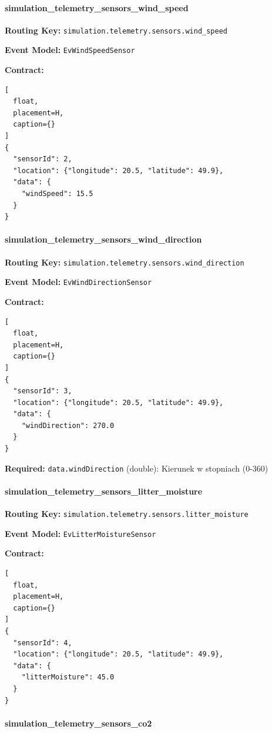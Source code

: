 \documentclass[11pt,a4paper] {article}
\begin{document}
\paragraph{simulation\_telemetry\_sensors\_wind\_speed}

\textbf{Routing Key:} \texttt{simulation.telemetry.sensors.wind\_speed}

\textbf{Event Model:} \texttt{EvWindSpeedSensor}

\textbf{Contract:}
\begin{lstlisting}[
  float,
  placement=H,
  caption={}
]
{
  "sensorId": 2,
  "location": {"longitude": 20.5, "latitude": 49.9},
  "data": {
    "windSpeed": 15.5
  }
}
\end{lstlisting}

\paragraph{simulation\_telemetry\_sensors\_wind\_direction}

\textbf{Routing Key:} \texttt{simulation.telemetry.sensors.wind\_direction}

\textbf{Event Model:} \texttt{EvWindDirectionSensor}

\textbf{Contract:}
\begin{lstlisting}[
  float,
  placement=H,
  caption={}
]
{
  "sensorId": 3,
  "location": {"longitude": 20.5, "latitude": 49.9},
  "data": {
    "windDirection": 270.0
  }
}
\end{lstlisting}

\textbf{Required:} \texttt{data.windDirection} (double): Kierunek w stopniach (0-360)

\paragraph{simulation\_telemetry\_sensors\_litter\_moisture}

\textbf{Routing Key:} \texttt{simulation.telemetry.sensors.litter\_moisture}

\textbf{Event Model:} \texttt{EvLitterMoistureSensor}

\textbf{Contract:}
\begin{lstlisting}[
  float,
  placement=H,
  caption={}
]
{
  "sensorId": 4,
  "location": {"longitude": 20.5, "latitude": 49.9},
  "data": {
    "litterMoisture": 45.0
  }
}
\end{lstlisting}

\paragraph{simulation\_telemetry\_sensors\_co2}
\end{document}

